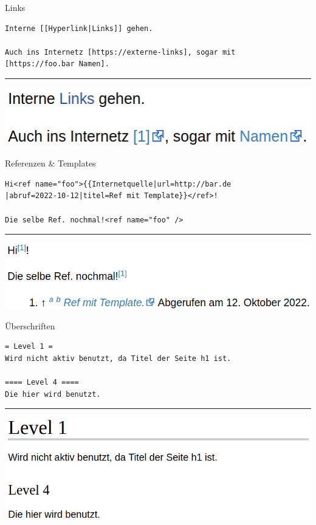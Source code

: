 \documentclass{beamer}
\begin{document}
	\begin{frame}[fragile]{Links}
		\begin{verbatim}
Interne [[Hyperlink|Links]] gehen.

Auch ins Internetz [https://externe-links], sogar mit
[https://foo.bar Namen].
		\end{verbatim}
		\hrule\n
		\includegraphics[scale=0.35]{images/wikitext-example-1-links.png}
	\end{frame}
	
	\begin{frame}[fragile]{Referenzen \& Templates}
		\begin{verbatim}
Hi<ref name="foo">{{Internetquelle|url=http://bar.de
|abruf=2022-10-12|titel=Ref mit Template}}</ref>!

Die selbe Ref. nochmal!<ref name="foo" />
		\end{verbatim}
		\hrule\n
		\includegraphics[scale=0.35]{images/wikitext-example-2-refs.png}
	\end{frame}
	
	\begin{frame}[fragile]{Überschriften}
		\begin{verbatim}
= Level 1 =
Wird nicht aktiv benutzt, da Titel der Seite h1 ist.

==== Level 4 ====
Die hier wird benutzt.
		\end{verbatim}
		\hrule\n
		\includegraphics[scale=0.35]{images/wikitext-example-3-headings.png}
	\end{frame}
\end{document}
